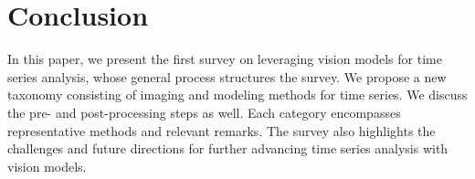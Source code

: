 \section{Conclusion}

In this paper, we present the first survey on leveraging vision models for time series analysis, whose general process structures the survey. We propose a new taxonomy consisting of imaging and modeling methods for time series. We discuss the pre- and post-processing steps as well. Each category encompasses representative methods and relevant remarks. The survey also highlights the challenges and future directions for further advancing time series analysis with vision models.
